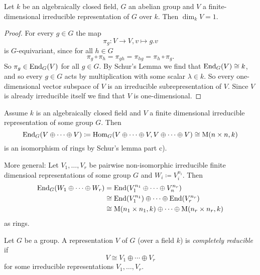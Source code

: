 \begin{cor}
  Let $k$ be an algebraically closed field, $G$ an abelian group and $V$ a finite-dimensional irreducible representation of $G$ over $k$.
  Then $\dim_k V = 1$.
\end{cor}
\begin{proof}
  For every $g \in G$ the map
  \[
            \pi_g
    \colon  V \to V,
            v
    \mapsto g.v
  \]
  is $G$-equivariant, since for all $h \in G$
  \[
      \pi_g \circ \pi_h
    = \pi_{gh}
    = \pi_{hg}
    = \pi_h \circ \pi_g.
  \]
  So $\pi_g \in \operatorname{End}_G(V)$ for all $g \in G$.
  By Schur’s Lemma we find that $\operatorname{End}_G(V) \cong k$, and so every $g \in G$ acts by multiplication with some scalar $\lambda \in k$.
  So every one-dimensional vector subspace of $V$ is an irreducible subrepresentation of $V$.
  Since $V$ is already irreducible itself we find that $V$ is one-dimensional.
\end{proof}


\begin{rem}
  Assume $k$ is an algebraically closed field and $V$ a finite dimensional irreducible representation of some group $G$.
  Then
  \[
              \operatorname{End}_G(V \oplus \dotsb \oplus V)
    \coloneqq \operatorname{Hom}_G(V \oplus \dotsb \oplus V, V \oplus \dotsb \oplus V)
    \cong     \operatorname{M}(n \times n, k)
  \]
  is an isomorphism of rings by Schur’s lemma part c).
  
  More general:
  Let $V_1, \dotsc, V_r$ be pairwise non-isomorphic irreducible finite dimensioal representations of some group $G$ and $W_i \coloneqq V_i^{n_i}$.
  Then
  \begin{align*}
            \operatorname{End}_G(W_1 \oplus \dotsb \oplus W_r)
    &=      \operatorname{End}(V_1^{n_1} \oplus \dotsb \oplus V_n^{n_r})
    \\
    &\cong  \operatorname{End}(V_1^{n_1}) \oplus \dotsb \oplus \operatorname{End}(V_r^{n_r})
    \\
    &\cong  \operatorname{M}(n_1 \times n_1, k) \oplus \dotsb \oplus \operatorname{M}(n_r \times n_r, k)
  \end{align*}
  as rings.
\end{rem}


\begin{defi}
  Let $G$ be a group.
  A representation $V$ of $G$ (over a field $k$) is \emph{completely reducible} if
  \[
          V
    \cong V_1 \oplus \dotsb \oplus V_r
  \]
  for some irreducible representations $V_1, \dotsc, V_r$.
\end{defi}


